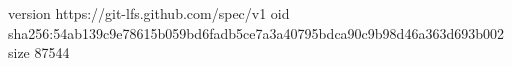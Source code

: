 version https://git-lfs.github.com/spec/v1
oid sha256:54ab139c9e78615b059bd6fadb5ce7a3a40795bdca90c9b98d46a363d693b002
size 87544
